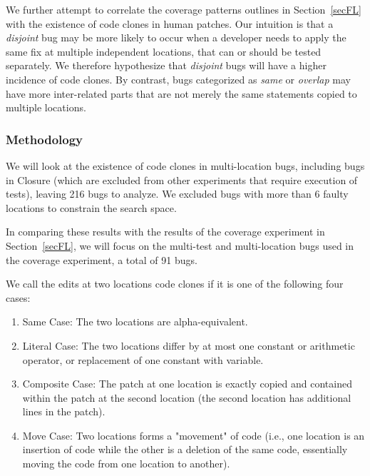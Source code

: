 \documentclass[sigconf, timestamp-false, anonymous=true]{acmart}
\begin{document}
We further attempt to correlate the coverage patterns outlines in
Section~\ref{secFL} with the existence of code clones in human patches.  Our 
intuition is that a \emph{disjoint} bug may be more likely to occur when a
developer needs to apply the same fix at multiple independent locations, that
can or should be tested separately.  We therefore 
 hypothesize that \emph{disjoint} bugs will have a higher incidence of code
clones. By contrast, bugs categorized as \emph{same} or \emph{overlap} may have
more inter-related parts that are not merely the same statements copied to
multiple locations.


\subsubsection{Methodology}
\label{sec52}
We will look at the existence of code clones in multi-location bugs, including bugs in Closure (which are 
excluded from other experiments that require execution of tests), leaving 216 bugs to analyze. We 
excluded bugs with more than 6 faulty locations to constrain the search space.

In comparing these results with the results of the coverage experiment in
Section~\ref{secFL}, we will focus on the multi-test and multi-location bugs used in the coverage 
experiment, a total of 91 bugs.

We call the edits at two locations code clones if it is one of the following four cases:
\begin{enumerate}
	\item Same Case: The two locations are alpha-equivalent. 
	\item Literal Case: The two locations differ by at most one constant or arithmetic operator,
	or replacement of one constant with variable.
	\item Composite Case: The patch at one location is exactly copied and contained within the patch at 
	the 
	second location (the second location  has additional lines in the patch).
	\item Move Case: Two locations forms a "movement" of code (i.e., one location is an insertion of 
	code 
	while the other is a deletion of the same code, essentially moving the code from one location to 
	another).
\end{enumerate}
\end{document}
